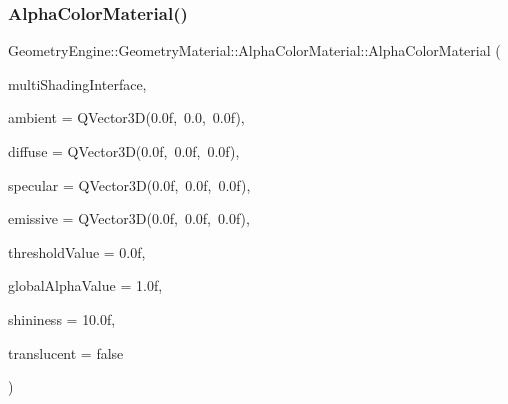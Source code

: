 \subsubsection{\texorpdfstring{AlphaColorMaterial()}{AlphaColorMaterial()}\hspace{0.1cm}{\footnotesize\ttfamily [1/2]}}
{\footnotesize\ttfamily Geometry\+Engine\+::\+Geometry\+Material\+::\+Alpha\+Color\+Material\+::\+Alpha\+Color\+Material (\begin{DoxyParamCaption}\item[{const \mbox{\hyperlink{class_geometry_engine_1_1_custom_shading_1_1_multi_shading_interface}{Custom\+Shading\+::\+Multi\+Shading\+Interface}} $\ast$const}]{multi\+Shading\+Interface,  }\item[{const Q\+Vector3D \&}]{ambient = {\ttfamily QVector3D(0.0f,~0.0,~0.0f)},  }\item[{const Q\+Vector3D \&}]{diffuse = {\ttfamily QVector3D(0.0f,~0.0f,~0.0f)},  }\item[{const Q\+Vector3D \&}]{specular = {\ttfamily QVector3D(0.0f,~0.0f,~0.0f)},  }\item[{const Q\+Vector3D \&}]{emissive = {\ttfamily QVector3D(0.0f,~0.0f,~0.0f)},  }\item[{float}]{threshold\+Value = {\ttfamily 0.0f},  }\item[{float}]{global\+Alpha\+Value = {\ttfamily 1.0f},  }\item[{float}]{shininess = {\ttfamily 10.0f},  }\item[{bool}]{translucent = {\ttfamily false} }\end{DoxyParamCaption})}

